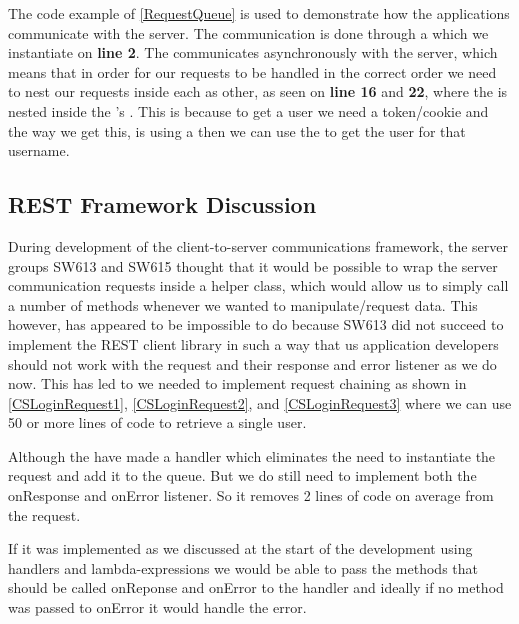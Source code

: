 The code example of \autoref{RequestQueue} is used to demonstrate how the
applications communicate with the server. The communication is done through a
 which we instantiate on \textbf{line 2}. The
 communicates asynchronously with the server, which means
that in order for our requests to be handled in the correct order we need to
nest our requests inside each as other, as seen on \textbf{line 16} and
\textbf{22}, where the  is nested inside the
's . This is because to get a user we need
a token/cookie and the way we get this, is using a  then
we can use the  to get the user for that username.

\subsection{REST Framework Discussion}
During development of the client-to-server communications framework, the server
groups SW613 and SW615 thought that it would be possible to wrap the server
communication requests inside a helper class, which would allow us to simply
call a number of methods whenever we wanted to manipulate/request data. This
however, has appeared to be impossible to do because SW613 did not succeed to
implement the REST client library in such a way that us application developers
should not work with the request and their response and error listener as we do
now. This has led to we needed to implement request chaining as shown in \autoref{CSLoginRequest1},
\autoref{CSLoginRequest2}, and \autoref{CSLoginRequest3} where we can use 50 or
more lines of code to retrieve a single user.\nl

Although the have made a handler which eliminates the need to instantiate the
request and add it to the queue. But we do still need to implement both
the onResponse and onError listener. So it removes 2 lines of code on average from
the request.\nl

If it was implemented as we discussed at the start of the development using
handlers and lambda-expressions we would be able to pass the methods that should
be called onReponse and onError to the handler and ideally if no method was
passed to onError it would handle the error.




